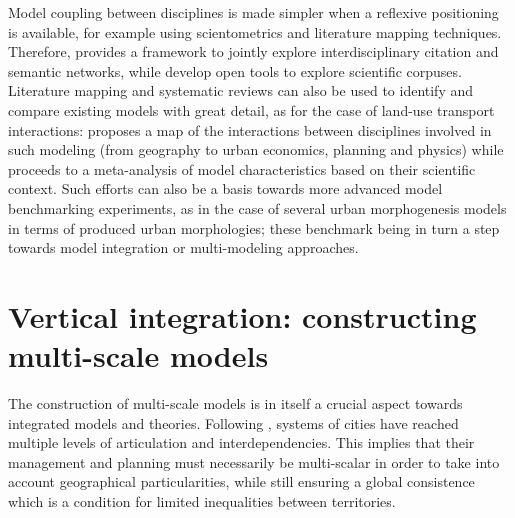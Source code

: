 Model coupling between disciplines is made simpler when a reflexive positioning is available, for example using scientometrics and literature mapping techniques. Therefore, \cite{raimbault2019exploration} provides a framework to jointly explore interdisciplinary citation and semantic networks, while \cite{raimbault2021empowering} develop open tools to explore scientific corpuses. Literature mapping and systematic reviews can also be used to identify and compare existing models with great detail, as for the case of land-use transport interactions: \cite{raimbault2021interdisciplinary} proposes a map of the interactions between disciplines involved in such modeling (from geography to urban economics, planning and physics) while \cite{raimbault2019meta} proceeds to a meta-analysis of model characteristics based on their scientific context. Such efforts can also be a basis towards more advanced model benchmarking experiments, as \cite{raimbault2020comparison} in the case of several urban morphogenesis models in terms of produced urban morphologies; these benchmark being in turn a step towards model integration or multi-modeling approaches.


\section{Vertical integration: constructing multi-scale models}


The construction of multi-scale models is in itself a crucial aspect towards integrated models and theories. Following \cite{rozenblat2018conclusion}, systems of cities have reached multiple levels of articulation and interdependencies. This implies that their management and planning must necessarily be multi-scalar in order to take into account geographical particularities, while still ensuring a global consistence which is a condition for limited inequalities between territories.


